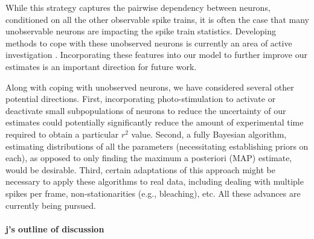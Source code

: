 While this strategy captures the pairwise dependency between neurons, conditioned on all the other observable spike trains, it is often the case that many unobservable neurons are impacting the spike train statistics.  Developing methods to cope with these unobserved neurons is currently an area of active investigation \cite{Duane 1 and 2, liam}.  Incorporating these features into our model to further improve our estimates is an important direction for future work.

Along with coping with unobserved neurons, we have considered several other potential directions.  First, incorporating photo-stimulation to activate or deactivate small subpopulations of neurons to reduce the uncertainty of our estimates could potentially significantly reduce the amount of experimental time required to obtain a particular $r^2$ value.  Second, a fully Bayesian algorithm, estimating distributions of all the parameters (necessitating establishing priors on each), as opposed to only finding the maximum a posteriori (MAP) estimate, would be desirable.  Third, certain adaptations of this approach might be necessary to apply these algorithms to real data, including dealing with multiple spikes per frame, non-stationarities (e.g., bleaching), etc.  All these advances are currently being pursued.




\paragraph{j's outline of discussion}

